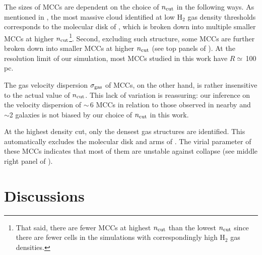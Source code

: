 \IfFileExists{emulateapjlegacy.cls}{\documentclass[iop]{emulateapjlegacy}}{\documentclass[iop]{emulateapj}}
\begin{document}
The sizes of MCCs are dependent on the choice of $n_{\rm cut}$ in the following ways.
As mentioned in , the most massive cloud identified at low H$_2$ gas density thresholds
corresponds to the molecular disk of \flower, which is broken down into multiple smaller MCCs at higher 
$n_{\rm cut}$\footnote{That said, there are fewer MCCs at highest $n_{\rm cut}$ than the lowest $n_{\rm cut}$ 
 since there are fewer cells in the simulations with correspondingly high H$_2$ gas densities.}.
Second, excluding such structure, some MCCs are further broken down into smaller MCCs at higher $n_{\rm cut}$ 
(see top panels of ). 
At the resolution limit of our simulation, most MCCs studied in this work have $R\simeq$\,100\,pc.
%

%
The gas velocity dispersion $\sigma_{\rm gas}$ of MCCs, on the other hand, is rather insensitive to the actual value of $n_{\rm cut}$.
This lack of variation is reassuring: our inference on the velocity dispersion of \z$\sim$\,6 MCCs in relation to those observed in
nearby and \z$\sim$2 galaxies is not biased by our choice of $n_{\rm cut}$ in this work.

At the highest density cut, only the densest gas structures are identified. This automatically excludes the molecular disk and arms 
of \flower. The virial parameter of these MCCs indicates that most of them are unstable against collapse 
(see middle right panel of ).  



\section{Discussions}\label{sec:diss}
\end{document}

